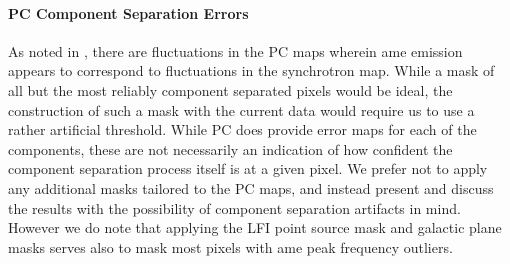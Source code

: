       \paragraph{PC Component Separation Errors}
        As noted in \cite{planck15X, hensley16}, there are fluctuations in the PC maps wherein \gls{ame} emission appears to correspond to fluctuations in the synchrotron map. While a mask of all but the most reliably component separated pixels would be ideal, the construction of such a mask with the current data would require us to use a rather artificial threshold. While PC does provide error maps for each of the components, these are not necessarily an indication of how confident the component separation process itself is at a given pixel. We prefer not to apply any additional masks tailored to the PC maps, and instead present and discuss the results with the possibility of component separation artifacts in mind. However we do note that applying the LFI point source mask and galactic plane masks serves also to mask most pixels with \gls{ame} peak frequency outliers.

